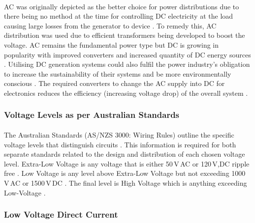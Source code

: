 \paragraph{}
AC was originally depicted as the better choice for power distributions due to there
being no method at the time for controlling DC electricity at the load causing large
losses from the generator to device \cite{Starke2008b}. To remedy this, AC distribution was used due to efficient transformers being developed to boost the voltage. AC remains the
fundamental power type but DC is growing in popularity with improved converters and
increased quantity of DC energy sources \cite{Starke2008b}. Utilising DC generation systems could also fulfil the power industry's obligation to increase the sustainability of their systems and be more environmentally conscious \cite{Starke2008a}. The required converters to change the AC supply into DC for electronics reduces the efficiency (increasing voltage drop) of the overall system \cite{Starke2008b}.    

\subsubsection{Voltage Levels as per Australian Standards}

\paragraph{}
The Australian Standards (AS/NZS 3000: Wiring Rules) outline the specific voltage levels that distinguish circuits \cite{StandardsAustralia2007}. This information is required for both separate standards related to the design and distribution of each chosen voltage level. Extra-Low Voltage is any voltage that is either 50\,V\,AC or 120\,V,DC ripple free \cite{StandardsAustralia2007}. Low Voltage is any level above Extra-Low Voltage but not exceeding 1000\,V\,AC or 1500\,V\,DC \cite{StandardsAustralia2007}. The final level is High Voltage which is anything exceeding Low-Voltage \cite{StandardsAustralia2007}.  


\subsubsection{Low Voltage Direct Current}

